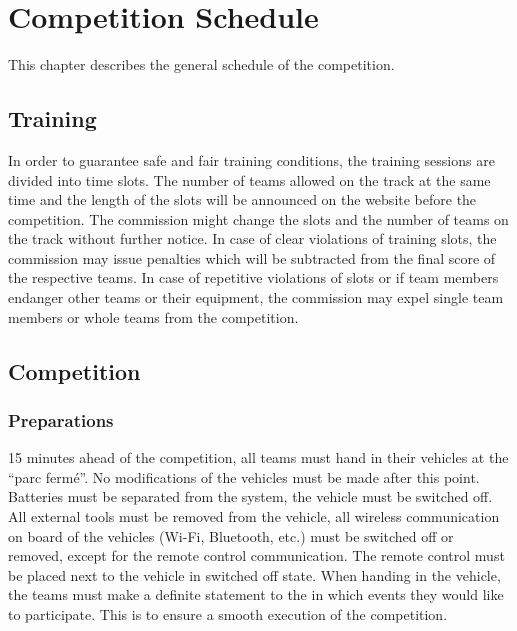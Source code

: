 \chapter{Competition Schedule}

This chapter describes the general schedule of the competition.

\section{Training}

In order to guarantee safe and fair training conditions, the training sessions
are divided into time slots. The number of teams allowed on the track at the
same time and the length of the slots will be announced on the website before
the competition. The commission might change the slots and the number of teams
on the track without further notice. In case of clear violations of training
slots, the commission may issue penalties which will be subtracted from the
final score of the respective teams. In case of repetitive violations of slots
or if team members endanger other teams or their equipment, the commission may
expel single team members or whole teams from the competition.



\section{Competition}
\subsection{Preparations}

15 minutes ahead of the competition, all teams must hand in their vehicles at the “parc fermé”. No modifications of the vehicles must be made after this point. Batteries must be separated from the system, the vehicle must be switched off. All external tools must be removed from the vehicle, all wireless communication on board of the vehicles (Wi-Fi, Bluetooth, etc.) must be switched off or removed, except for the remote control communication. The remote control must be placed next to the vehicle in switched off state. When handing in the vehicle, the teams must make a definite statement to the  in which events they would like to participate. This is to ensure a smooth execution of the competition.

